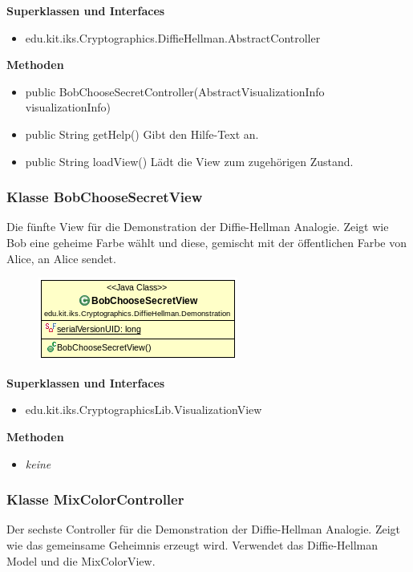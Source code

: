 \documentclass{article}
\begin{document}
      \textbf{Superklassen und Interfaces}
      \begin{itemize}
        \item edu.kit.iks.Cryptographics.DiffieHellman.AbstractController
      \end{itemize}

      \textbf{Methoden}
      \begin{itemize}
          \item public BobChooseSecretController(AbstractVisualizationInfo visualizationInfo)
        \item public String getHelp() \newline
        Gibt den Hilfe-Text an.
        \item public String loadView() \newline
        Lädt die View zum zugehörigen Zustand.
      \end{itemize}

\subsubsection{Klasse BobChooseSecretView}
      Die fünfte View für die Demonstration der Diffie-Hellman Analogie.
      Zeigt wie Bob eine geheime Farbe wählt und diese, gemischt mit
      der öffentlichen Farbe von Alice, an Alice sendet.

      \begin{figure}[H]
        \centering
        \includegraphics{resources/edu-kit-iks-Cryptographics-DiffieHellman-Demonstration-BobChooseSecretView}
      \end{figure}

      \textbf{Superklassen und Interfaces}
      \begin{itemize}
        \item edu.kit.iks.CryptographicsLib.VisualizationView
      \end{itemize}

      \textbf{Methoden}
      \begin{itemize}
        \item \textit{keine}
      \end{itemize}

\subsubsection{Klasse MixColorController}
      Der sechste Controller für die Demonstration der Diffie-Hellman Analogie.
      Zeigt wie das gemeinsame Geheimnis erzeugt wird.
      Verwendet das Diffie-Hellman Model und die MixColorView.
\end{document}
